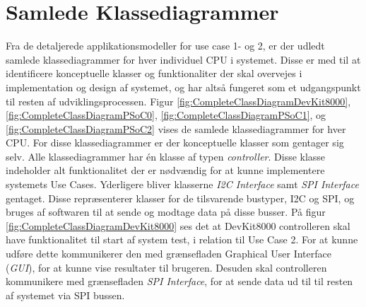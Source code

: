 \section{Samlede Klassediagrammer}
Fra de detaljerede applikationsmodeller for use case 1- og 2, er der udledt samlede klassediagrammer for hver individuel CPU i systemet. Disse er med til at identificere konceptuelle klasser og funktionaliter der skal overvejes i implementation og design af systemet, og har altså fungeret som et udgangspunkt til resten af udviklingsprocessen.\newline\noindent
Figur \ref{fig:CompleteClassDiagramDevKit8000}, \ref{fig:CompleteClassDiagramPSoC0}, \ref{fig:CompleteClassDiagramPSoC1}, og \ref{fig:CompleteClassDiagramPSoC2} vises de samlede klassediagrammer for hver CPU.\newline\noindent
For disse klassediagrammer er der konceptuelle klasser som gentager sig selv. Alle klassediagrammer har én klasse af typen \textit{controller}. Disse klasse indeholder alt funktionalitet der er nødvændig for at kunne implementere systemets Use Cases. Yderligere bliver klasserne \textit{I2C Interface} samt \textit{SPI Interface} gentaget. Disse repræsenterer klasser for de tilsvarende bustyper, I2C og SPI, og bruges af softwaren til at sende og modtage data på disse busser.\newline\noindent
På figur \ref{fig:CompleteClassDiagramDevKit8000} ses det at DevKit8000 controlleren skal have funktionalitet til start af system test, i relation til Use Case 2. For at kunne udføre dette kommunikerer den med grænsefladen Graphical User Interface (\textit{GUI}), for at kunne vise resultater til brugeren. Desuden skal controlleren kommunikere med grænsefladen \textit{SPI Interface}, for at sende data ud til til resten af systemet via SPI bussen.

